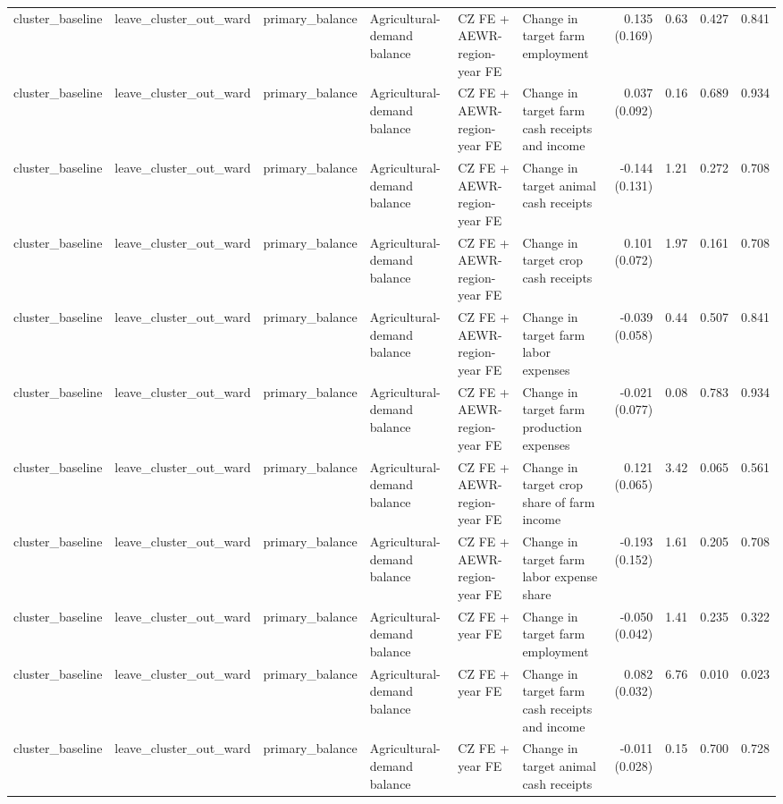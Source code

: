 \begin{tabular}{llllllrrrr}
cluster_baseline & leave_cluster_out_ward & primary_balance & Agricultural-demand balance & CZ FE + AEWR-region-year FE & Change in target farm employment & 0.135 (0.169) & 0.63 & 0.427 & 0.841 \\
cluster_baseline & leave_cluster_out_ward & primary_balance & Agricultural-demand balance & CZ FE + AEWR-region-year FE & Change in target farm cash receipts and income & 0.037 (0.092) & 0.16 & 0.689 & 0.934 \\
cluster_baseline & leave_cluster_out_ward & primary_balance & Agricultural-demand balance & CZ FE + AEWR-region-year FE & Change in target animal cash receipts & -0.144 (0.131) & 1.21 & 0.272 & 0.708 \\
cluster_baseline & leave_cluster_out_ward & primary_balance & Agricultural-demand balance & CZ FE + AEWR-region-year FE & Change in target crop cash receipts & 0.101 (0.072) & 1.97 & 0.161 & 0.708 \\
cluster_baseline & leave_cluster_out_ward & primary_balance & Agricultural-demand balance & CZ FE + AEWR-region-year FE & Change in target farm labor expenses & -0.039 (0.058) & 0.44 & 0.507 & 0.841 \\
cluster_baseline & leave_cluster_out_ward & primary_balance & Agricultural-demand balance & CZ FE + AEWR-region-year FE & Change in target farm production expenses & -0.021 (0.077) & 0.08 & 0.783 & 0.934 \\
cluster_baseline & leave_cluster_out_ward & primary_balance & Agricultural-demand balance & CZ FE + AEWR-region-year FE & Change in target crop share of farm income & 0.121 (0.065) & 3.42 & 0.065 & 0.561 \\
cluster_baseline & leave_cluster_out_ward & primary_balance & Agricultural-demand balance & CZ FE + AEWR-region-year FE & Change in target farm labor expense share & -0.193 (0.152) & 1.61 & 0.205 & 0.708 \\
cluster_baseline & leave_cluster_out_ward & primary_balance & Agricultural-demand balance & CZ FE + year FE & Change in target farm employment & -0.050 (0.042) & 1.41 & 0.235 & 0.322 \\
cluster_baseline & leave_cluster_out_ward & primary_balance & Agricultural-demand balance & CZ FE + year FE & Change in target farm cash receipts and income & 0.082 (0.032) & 6.76 & 0.010 & 0.023 \\
cluster_baseline & leave_cluster_out_ward & primary_balance & Agricultural-demand balance & CZ FE + year FE & Change in target animal cash receipts & -0.011 (0.028) & 0.15 & 0.700 & 0.728 \\

\end{tabular}
